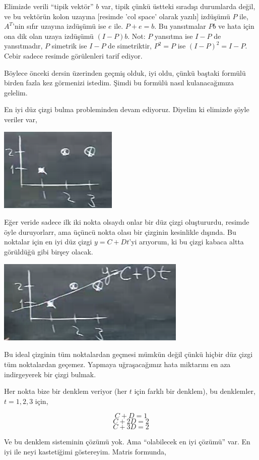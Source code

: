 \documentclass[12pt,fleqn]{article}\usepackage{../../common}
\begin{document}
Elimizde verili ``tipik vektör'' $b$ var, tipik çünkü üstteki sıradışı
durumlarda değil, ve bu vektörün kolon uzayına [resimde 'col space' olarak
yazılı] izdüşümü $P$ ile, $A^T$'nin sıfır uzayına izdüşümü ise $e$
ile. $P+e = b$. Bu yansıtmalar $Pb$ ve hata için ona dik olan uzaya
izdüşümü $(I-P)b$. Not: $P$ yansıtma ise $I-P$ de yansıtmadır, $P$ simetrik
ise $I-P$ de simetriktir, $P^2=P$ ise $(I-P)^2=I-P$. Cebir sadece resimde
görülenleri tarif ediyor.

Böylece önceki dersin üzerinden geçmiş olduk, iyi oldu, çünkü baştaki
formülü birden fazla kez görmenizi istedim. Şimdi bu formülü nasıl
kulanacağımıza gelelim.

En iyi düz çizgi bulma probleminden devam ediyoruz. Diyelim ki elimizde
şöyle veriler var, 

\includegraphics[height=4cm]{16_1.png}

Eğer veride sadece ilk iki nokta olsaydı onlar bir düz çizgi oluştururdu,
resimde öyle duruyorlarr, ama üçüncü nokta olası bir çizginin kesinlikle
dışında. Bu noktalar için en iyi düz çizgi $y=C+Dt$'yi arıyorum, ki bu
çizgi kabaca altta görüldüğü gibi birşey olacak.

\includegraphics[height=4cm]{16_2.png}

Bu ideal çizginin tüm noktalardan geçmesi mümkün değil çünkü hiçbir düz
çizgi tüm noktalardan geçemez. Yapmaya uğraşacağımız hata miktarını en aza
indirgeyerek bir çizgi bulmak. 

Her nokta bize bir denklem veriyor (her $t$ için farklı bir denklem), bu
denklemler, $t=1,2,3$ için,

$$ C + D = 1 $$
$$ C + 2D = 2 $$
$$ C + 3D = 2 $$

Ve bu denklem sisteminin çözümü yok. Ama ``olabilecek en iyi çözümü''
var. En iyi ile neyi kastetiğimi göstereyim. Matris formunda,
\end{document}
